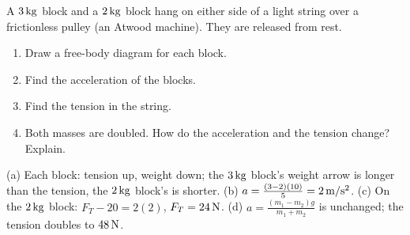 \begin{exo}{}
A $3\,\mathrm{kg}$ block and a $2\,\mathrm{kg}$ block hang on either side of a light string over a frictionless pulley (an Atwood machine). They are released from rest.
\begin{enumerate}[label=(\alph*)]
\item Draw a free-body diagram for each block.
\item Find the acceleration of the blocks.
\item Find the tension in the string.
\item Both masses are doubled. How do the acceleration and the tension change? Explain.
\end{enumerate}
\work{5cm}
\begin{solution}
(a) Each block: tension up, weight down; the $3\,\mathrm{kg}$ block's weight arrow is longer than the tension, the $2\,\mathrm{kg}$ block's is shorter. \;(b) $a=\frac{(3-2)(10)}{5}=2\,\mathrm{m/s^2}$. \;(c) On the $2\,\mathrm{kg}$ block: $F_T-20=2(2)$, $F_T=24\,\mathrm{N}$. \;(d) $a=\frac{(m_1-m_2)g}{m_1+m_2}$ is unchanged; the tension doubles to $48\,\mathrm{N}$.
\end{solution}
\end{exo}

